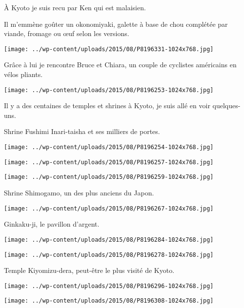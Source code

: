  \`A Kyoto je suis recu par Ken qui est malaisien. 

 Il m'emmène goûter un okonomiyaki, galette à base de chou complétée par viande, fromage ou \oe{}uf selon les versions. 
\begin{center} \texttt{[image: ../wp-content/uploads/2015/08/P8196331-1024x768.jpg]} \end{center}

\pagebreak
 Grâce à lui je rencontre Bruce et Chiara, un couple de cyclistes américains en vélos pliants. 
\begin{center} \texttt{[image: ../wp-content/uploads/2015/08/P8196253-1024x768.jpg]} \end{center}

 Il y a des centaines de temples et shrines à Kyoto, je suis allé en voir quelques-uns. 

 Shrine Fushimi Inari-taisha et ses milliers de portes.
\begin{center} \texttt{[image: ../wp-content/uploads/2015/08/P8196254-1024x768.jpg]} \end{center}
\begin{center} \texttt{[image: ../wp-content/uploads/2015/08/P8196257-1024x768.jpg]} \end{center}
\begin{center} \texttt{[image: ../wp-content/uploads/2015/08/P8196259-1024x768.jpg]} \end{center}

\pagebreak
 Shrine Shimogamo, un des plus anciens du Japon.
\begin{center} \texttt{[image: ../wp-content/uploads/2015/08/P8196267-1024x768.jpg]} \end{center}

 Ginkaku-ji, le pavillon d'argent.
\begin{center} \texttt{[image: ../wp-content/uploads/2015/08/P8196284-1024x768.jpg]} \end{center}
\begin{center} \texttt{[image: ../wp-content/uploads/2015/08/P8196278-1024x768.jpg]} \end{center}

 Temple Kiyomizu-dera, peut-être le plus visité de Kyoto.
\begin{center} \texttt{[image: ../wp-content/uploads/2015/08/P8196296-1024x768.jpg]} \end{center}
\begin{center} \texttt{[image: ../wp-content/uploads/2015/08/P8196308-1024x768.jpg]} \end{center}

